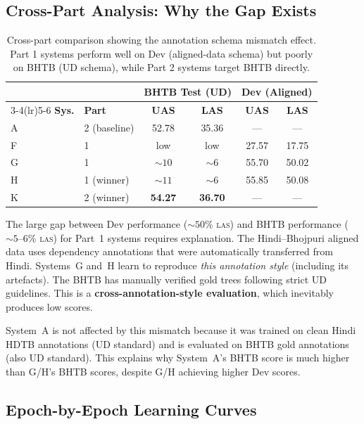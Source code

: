 \documentclass[12pt,a4paper,oneside]{report}
\newcommand{\las}{\textsc{las}}
\begin{document}
\subsection{Cross-Part Analysis: Why the Gap Exists}

\begin{table}[ht]
\centering
\caption{Cross-part comparison showing the annotation schema mismatch effect. Part 1 systems perform well on Dev (aligned-data schema) but poorly on BHTB (UD schema), while Part 2 systems target BHTB directly.}
\label{tab:cross_comp}
\begin{tabular}{@{}llcccc@{}}
\toprule
& & \multicolumn{2}{c}{\textbf{BHTB Test (UD)}} & \multicolumn{2}{c}{\textbf{Dev (Aligned)}} \\
\cmidrule(lr){3-4}\cmidrule(lr){5-6}
\textbf{Sys.} & \textbf{Part} & \textbf{UAS} & \textbf{LAS} & \textbf{UAS} & \textbf{LAS} \\
\midrule
A & 2 (baseline)  & 52.78 & 35.36 & --- & --- \\
F & 1             & low & low & 27.57 & 17.75 \\
G & 1             & ${\sim}10$ & ${\sim}6$ & 55.70 & 50.02 \\
H & 1 (winner)    & ${\sim}11$ & ${\sim}6$ & 55.85 & 50.08 \\
K & 2 (winner)    & \textbf{54.27} & \textbf{36.70} & --- & --- \\
\bottomrule
\end{tabular}
\end{table}

The large gap between Dev performance (${\sim}50\%$ \las{}) and BHTB performance
(${\sim}5$--6\% \las{}) for Part~1 systems requires explanation. The
Hindi--Bhojpuri aligned data uses dependency annotations that were automatically transferred
from Hindi. Systems~G and~H learn to reproduce \emph{this annotation style}
(including its artefacts). The BHTB has manually verified gold trees following strict
UD guidelines. This is a \textbf{cross-annotation-style evaluation}, which
inevitably produces low scores.

System~A is not affected by this mismatch because it was trained on clean Hindi HDTB
annotations (UD standard) and is evaluated on BHTB gold annotations (also UD
standard). This explains why System~A's BHTB score is much higher than G/H's BHTB
scores, despite G/H achieving higher Dev scores.

\subsection{Epoch-by-Epoch Learning Curves}
\end{document}
